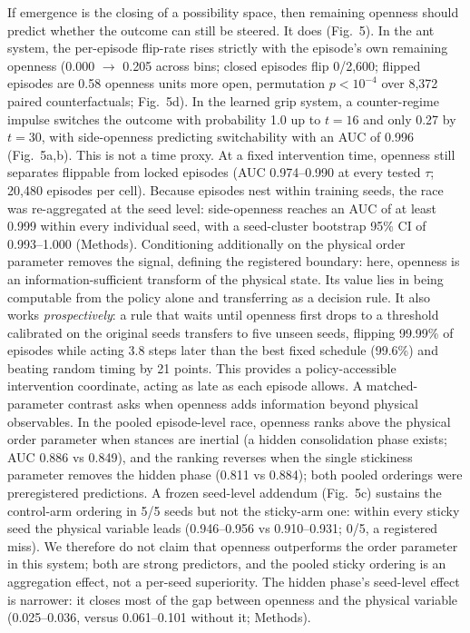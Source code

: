 \documentclass[11pt]{article}
\begin{document}
If emergence is the closing of a possibility space, then remaining
openness should predict whether the outcome can still be steered. It
does (Fig.~5). In the ant system, the per-episode flip-rate rises
strictly with the episode's own remaining openness (0.000 $\to$ 0.205
across bins; closed episodes flip 0/2{,}600; flipped episodes are 0.58
openness units more open, permutation $p < 10^{-4}$ over 8{,}372
paired counterfactuals; Fig.~5d). In the learned grip system, a
counter-regime impulse switches the outcome with probability 1.0 up to
$t=16$ and only 0.27 by $t=30$, with side-openness predicting
switchability with an AUC of 0.996 (Fig.~5a,b). This is not a time
proxy. At a fixed intervention time, openness still separates flippable
from locked episodes (AUC 0.974--0.990 at every tested $\tau$; 20{,}480
episodes per cell). Because episodes nest within training seeds, the
race was re-aggregated at the seed level: side-openness reaches an AUC
of at least 0.999 within every individual seed, with a seed-cluster
bootstrap 95\% CI of 0.993--1.000 (Methods). Conditioning additionally on the physical order
parameter removes the signal, defining the registered boundary: here,
openness is an information-sufficient transform of the physical state.
Its value lies in being computable from the policy alone and
transferring as a decision rule. It also works \emph{prospectively}: a
rule that waits until openness first drops to a threshold calibrated on
the original seeds transfers to five unseen seeds, flipping 99.99\% of
episodes while acting 3.8 steps later than the best fixed schedule
(99.6\%) and beating random timing by 21 points. This provides a
policy-accessible intervention coordinate, acting as late as each
episode allows. A matched-parameter contrast asks when openness adds
information beyond physical observables. In the pooled episode-level
race, openness ranks above the physical order parameter when stances
are inertial (a hidden consolidation phase exists; AUC 0.886 vs
0.849), and the ranking reverses when the single stickiness parameter
removes the hidden phase (0.811 vs 0.884); both pooled
orderings were preregistered predictions. A frozen seed-level addendum
(Fig.~5c) sustains the control-arm ordering in 5/5 seeds but not the
sticky-arm one: within every sticky seed the physical variable leads
(0.946--0.956 vs 0.910--0.931; 0/5, a registered miss). We therefore do not claim
that openness outperforms the order parameter in this system; both are
strong predictors, and the pooled sticky ordering is an aggregation
effect, not a per-seed superiority. The hidden phase's seed-level
effect is narrower: it closes most of the gap between openness and the
physical variable (0.025--0.036, versus 0.061--0.101 without it;
Methods).
\end{document}
